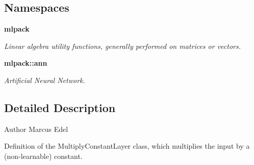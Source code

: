 \subsection*{Namespaces}
\begin{DoxyCompactItemize}
\item 
 {\bf mlpack}
\begin{DoxyCompactList}\small\item\em Linear algebra utility functions, generally performed on matrices or vectors. \end{DoxyCompactList}\item 
 {\bf mlpack\+::ann}
\begin{DoxyCompactList}\small\item\em Artificial Neural Network. \end{DoxyCompactList}\end{DoxyCompactItemize}


\subsection{Detailed Description}
\begin{DoxyAuthor}{Author}
Marcus Edel
\end{DoxyAuthor}
Definition of the Multiply\+Constant\+Layer class, which multiplies the input by a (non-\/learnable) constant. 